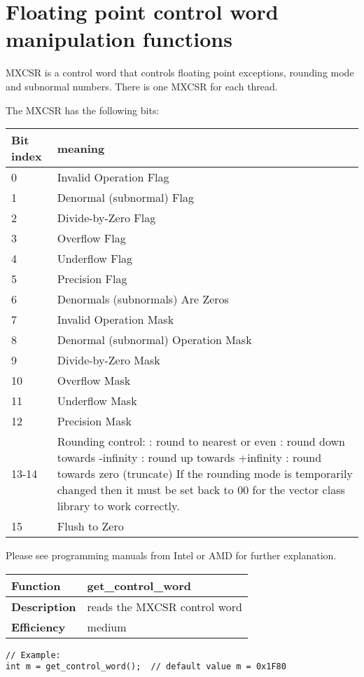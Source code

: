 \documentclass[vcl_manual.tex]{subfiles}
\begin{document}
\section{Floating point control word manipulation functions}\label{FPControlWordManipulationFunctions}

MXCSR is a control word that controls floating point exceptions, rounding mode and subnormal numbers. There is one MXCSR for each thread. 

The MXCSR has the following bits:
\begin{tabular}{|p{25mm}|p{100mm}|}
\hline
\bfseries Bit index & \bfseries meaning \\ \hline
0 & Invalid Operation Flag \\ \hline
1 & Denormal (subnormal) Flag \\ \hline
2 & Divide-by-Zero Flag \\ \hline
3 & Overflow Flag \\ \hline
4 & Underflow Flag \\ \hline
5 & Precision Flag \\ \hline
6 & Denormals (subnormals) Are Zeros \\ \hline
7 & Invalid Operation Mask \\ \hline
8 & Denormal (subnormal) Operation Mask \\ \hline
9 & Divide-by-Zero Mask \\ \hline
10 & Overflow Mask \\ \hline
11 & Underflow Mask \\ \hline
12 & Precision Mask \\ \hline
13-14 & Rounding control: \newline
00: round to nearest or even \newline
01: round down towards -infinity \newline
10: round up towards +infinity \newline
11: round towards zero (truncate) \newline
If the rounding mode is temporarily changed then it must be set back to 00 for the vector class library to work correctly. \\ \hline
15 & Flush to Zero \\ \hline
\end{tabular}

Please see programming manuals from Intel or AMD for further explanation.


\begin{tabular}{|p{25mm}|p{100mm}|}
\hline
\bfseries Function & get\_control\_word \\ \hline
\bfseries Description & reads the MXCSR control word \\ \hline
\bfseries Efficiency & medium \\ \hline
\end{tabular}
\begin{lstlisting}[frame=none]
// Example:
int m = get_control_word();  // default value m = 0x1F80
\end{lstlisting}
\end{document}

